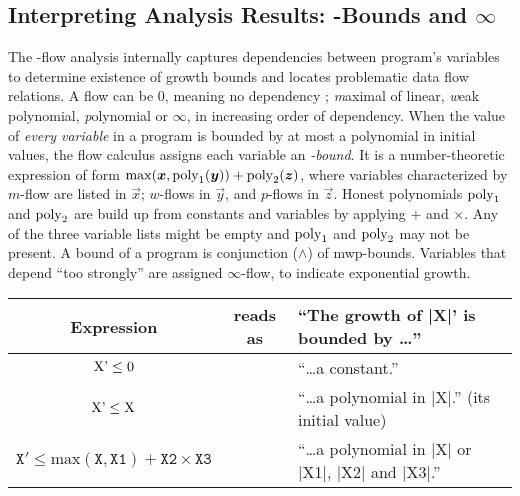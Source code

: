 \documentclass[runningheads]{llncs}
\begin{document}
\subsection{Interpreting Analysis Results: \mwp-Bounds and $\infty$} %
\label{subsec:bound}


The \mwp-flow analysis internally captures dependencies between program's variables to 
determine existence of growth bounds and locates problematic data flow relations.
A flow can be 0, meaning no dependency%
; \emph{m}aximal of linear, \emph{w}eak polynomial, \emph{p}olynomial or $\infty$, in increasing order of dependency.
When the value of \emph{every variable} in a program is bounded by at most a polynomial in initial values, the flow calculus assigns each variable an \emph{\mwp-bound}.
It is a number-theoretic expression of form $\max(\vec x, \poly_1(\vec y)) + \poly_2(\vec z)$,
where variables characterized by $m$-flow are listed in $\vec x$; $w$-flows in $\vec y$, and $p$-flows in $\vec z$.
Honest polynomials $\operatorname{poly}_1$ and $\operatorname{poly}_2$ are build up from constants and variables by applying $+$ and $\times$.
Any of the three variable lists might be empty and $\operatorname{poly}_1$ and $\operatorname{poly}_2$ may not be present.
A bound of a program is conjunction ($\wedge$) of mwp-bounds.
Variables that depend \enquote{too strongly} are assigned $\infty$-flow, to indicate exponential growth.

\noindent
\begin{tabularx}{\textwidth-.1in}{c c@{\hskip 0.1in} X}
	\toprule
	Expression & reads as & \enquote{The growth of \prc|X|' is bounded by \dots}\\
	\midrule
	$\text{\prc|X|'} \leq 0$ &  & \enquote{\dots a constant.} \\
	$\text{\prc|X|'} \leq \text{\prc|X|}$ &  & \enquote{\dots a polynomial in \prc|X|.} (its initial value)
	\\
	$\texttt{X}' \leq \text{max}(\texttt{X},\texttt{X1})+\texttt{X2}\times\texttt{X3}$
	& & \enquote{\dots a polynomial in \prc|X| or \prc|X1|,  \prc|X2| and  \prc|X3|.}\\
	\bottomrule 
\end{tabularx} 
\end{document}
